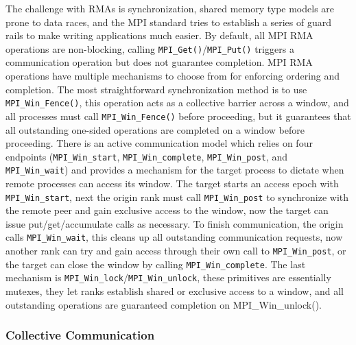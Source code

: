 The challenge with RMAs is synchronization, shared memory type models are prone to data races, and the MPI standard tries to establish a series of guard rails to make writing applications much easier.
By default, all MPI RMA operations are non-blocking, calling \texttt{MPI\_Get()}/\texttt{MPI\_Put()} triggers a communication operation but does not guarantee completion.
MPI RMA operations have multiple mechanisms to choose from for enforcing ordering and completion.
The most straightforward synchronization method is to use \texttt{MPI\_Win\_Fence()}, this operation acts as a collective barrier across a window, and all processes must call \texttt{MPI\_Win\_Fence()} before proceeding, but it guarantees that all outstanding one-sided operations are completed on a window before proceeding. 
There is an active communication model which relies on four endpoints (\texttt{MPI\_Win\_start}, \texttt{MPI\_Win\_complete}, \texttt{MPI\_Win\_post}, and \texttt{MPI\_Win\_wait}) and provides a mechanism for the target process to dictate when remote processes can access its window.
The target starts an access epoch with \texttt{MPI\_Win\_start}, next the origin rank must call \texttt{MPI\_Win\_post} to synchronize with the remote peer and gain exclusive access to the window, now the target can issue put/get/accumulate calls as necessary.
To finish communication, the origin calls \texttt{MPI\_Win\_wait}, this cleans up all outstanding communication requests, now another rank can try and gain access through their own call to \texttt{MPI\_Win\_post}, or the target can close the window by calling \texttt{MPI\_Win\_complete}.
The last mechanism is \texttt{MPI\_Win\_lock}/\texttt{MPI\_Win\_unlock}, these primitives are essentially mutexes, they let ranks establish shared or exclusive access to a window, and all outstanding operations are guaranteed completion on MPI\_Win\_unlock().


\subsubsection{Collective Communication}



